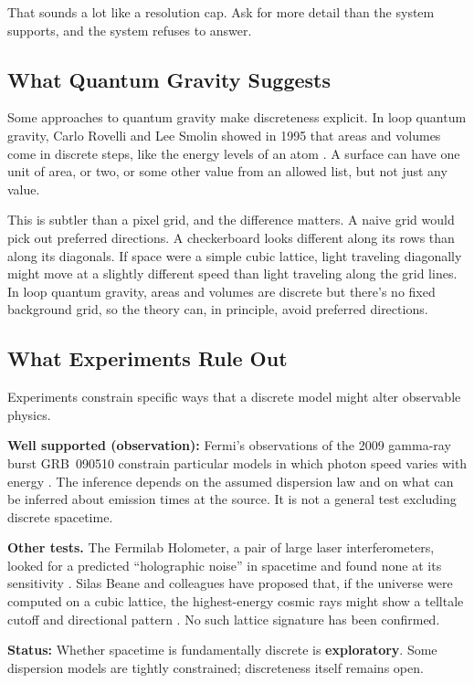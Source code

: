 That sounds a lot like a resolution cap. Ask for more detail than the system supports, and the system refuses to answer.

\subsection{What Quantum Gravity Suggests}

Some approaches to quantum gravity make discreteness explicit. In loop quantum gravity, Carlo Rovelli and Lee Smolin showed in 1995 that areas and volumes come in discrete steps, like the energy levels of an atom \cite{rovellismolin1995}. A surface can have one unit of area, or two, or some other value from an allowed list, but not just any value.

This is subtler than a pixel grid, and the difference matters. A naive grid would pick out preferred directions. A checkerboard looks different along its rows than along its diagonals. If space were a simple cubic lattice, light traveling diagonally might move at a slightly different speed than light traveling along the grid lines. In loop quantum gravity, areas and volumes are discrete but there's no fixed background grid, so the theory can, in principle, avoid preferred directions.

\subsection{What Experiments Rule Out}

Experiments constrain specific ways that a discrete model might alter observable physics.

\begin{researchnotebox}
\textbf{Well supported (observation):} Fermi's observations of the 2009 gamma-ray burst GRB~090510 constrain particular models in which photon speed varies with energy \cite{abdo2009}. The inference depends on the assumed dispersion law and on what can be inferred about emission times at the source. It is not a general test excluding discrete spacetime.

\textbf{Other tests.} The Fermilab Holometer, a pair of large laser interferometers, looked for a predicted ``holographic noise'' in spacetime and found none at its sensitivity \cite{chou2016}. Silas Beane and colleagues have proposed that, if the universe were computed on a cubic lattice, the highest-energy cosmic rays might show a telltale cutoff and directional pattern \cite{beane2014}. No such lattice signature has been confirmed.

\textbf{Status:} Whether spacetime is fundamentally discrete is \textbf{exploratory}. Some dispersion models are tightly constrained; discreteness itself remains open.
\end{researchnotebox}


